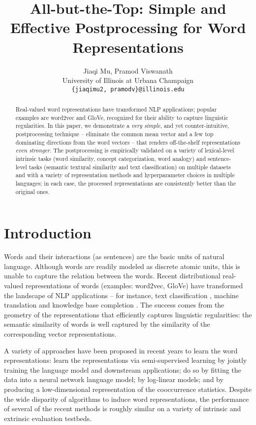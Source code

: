 \documentclass{article} \usepackage{acl2017,times}
\title{All-but-the-Top: Simple and Effective Postprocessing for Word Representations}
\author{Jiaqi Mu,  Pramod Viswanath \\
University of Illinois at Urbana Champaign\\
{\tt \{jiaqimu2, pramodv\}@illinois.edu}}
\begin{document}
\maketitle

\begin{abstract}
Real-valued word representations have transformed NLP applications; popular examples are word2vec and GloVe, recognized for their ability to capture linguistic regularities. In this paper, we demonstrate a {\em very simple}, and yet counter-intuitive, postprocessing technique -- eliminate the common mean vector and a few top dominating directions from the word vectors -- that renders off-the-shelf representations {\em even stronger}. The postprocessing is empirically validated on a variety of lexical-level intrinsic tasks (word similarity, concept categorization, word analogy) and sentence-level tasks (semantic textural similarity and { text classification}) on multiple datasets and with a variety of representation methods and hyperparameter choices in multiple languages; in each case, the processed representations are consistently better than the original ones. 
\end{abstract}

\section{Introduction}

Words and their interactions (as sentences) are the basic units of natural language.  Although words are readily modeled as discrete atomic units, this is unable to capture the relation between the words.  Recent distributional real-valued representations of words  (examples: word2vec, GloVe) have transformed the landscape of NLP applications -- for instance, text classification \citep{socher2013recursive,maas2011learning,kim2014convolutional}, machine translation \citep{sutskever2014sequence,bahdanau2014neural} and knowledge base completion \citep{bordes2013translating,socher2013reasoning}.  The success  comes from the geometry of the representations that efficiently captures  linguistic regularities: the semantic similarity of words is   well captured by the similarity of the corresponding vector representations. 

A variety of approaches have been proposed in recent years to learn the word representations:  \citet{collobert2011natural,turian2010word} learn the representations via semi-supervised learning by jointly training the language model and  downstream applications;  \citet{bengio2003neural,mikolov2010recurrent,huang2012improving} do so by fitting the data into a neural network language model; \citet{mikolov2013efficient,mnih2007three} by log-linear models; and \citet{dhillon2012two,pennington2014glove,levy2014neural,stratos2015model,arora2015rand} by producing a low-dimensional representation of the cooccurrence statistics. Despite the  wide disparity of algorithms to induce word representations, the performance of several of the recent methods  is roughly similar on a  variety of intrinsic and extrinsic evaluation testbeds. 
\end{document}
